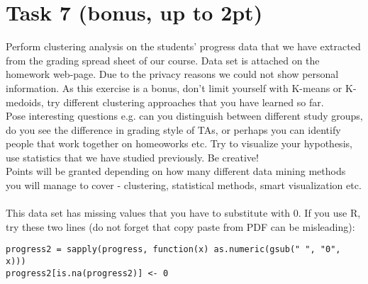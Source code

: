 \documentclass{article}
\begin{document}
\section*{Task 7 (bonus, up to 2pt)}
Perform clustering analysis on the students' progress data that we have extracted from the grading spread sheet of our course. Data set is attached on the homework web-page. Due to the privacy reasons we could not show personal information. As this exercise is a bonus, don't limit yourself with K-means or K-medoids, try different clustering approaches that you have learned so far. \\
Pose interesting questions e.g. can you distinguish between different study groups, do you see the difference in grading style of TAs, or perhaps you can identify people that work together on homeoworks etc. Try to visualize your hypothesis, use statistics that we have studied previously. Be creative!\\
Points will be granted depending on how many different data mining methods you will manage to cover - clustering, statistical methods, smart visualization etc.\\\\
This data set has missing values that you have to substitute with 0. If you use R, try these two lines (do not forget that copy paste from PDF can be misleading):
\begin{lstlisting}
progress2 = sapply(progress, function(x) as.numeric(gsub(" ", "0", x))) 
progress2[is.na(progress2)] <- 0
\end{lstlisting}
\end{document}
